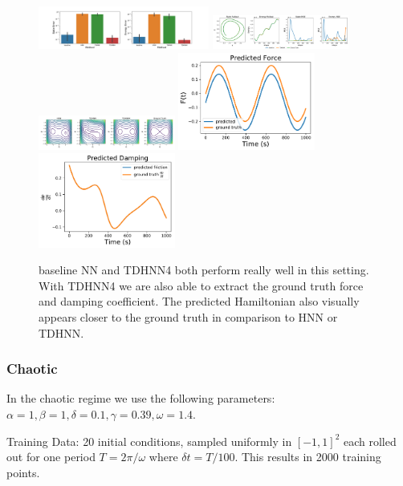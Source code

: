 \documentclass[twoside]{article}
\begin{document}
\begin{figure}[h!]
\centering
\includegraphics[width=0.5\textwidth]{figures/duffing_1_errors.pdf}
\includegraphics[width=0.4\textwidth]{figures/duffing_1_pred.pdf}
\includegraphics[width=0.4\textwidth]{figures/duffing_ham_1.pdf}
\includegraphics[width=0.4\textwidth]{figures/TDHNN4_duffing_1.pdf}
\includegraphics[width=0.4\textwidth]{figures/TDHNN4_duffing_damp_1.pdf}
\caption{baseline NN and TDHNN4 both perform really well in this setting. With TDHNN4 we are also able to extract the ground truth force and damping coefficient. The predicted Hamiltonian also visually appears closer to the ground truth in comparison to HNN or TDHNN.}
\end{figure}

\subsubsection{Chaotic}

In the chaotic regime we use the following parameters:
$\alpha =1,\beta=1,\delta=0.1,\gamma=0.39,\omega=1.4$. 

Training Data: 20 initial conditions, sampled uniformly in $[-1,1]^2$ each rolled out for one period $T=2\pi/\omega$ where $\delta t = T/100$. This results in 2000 training points.
\end{document}
